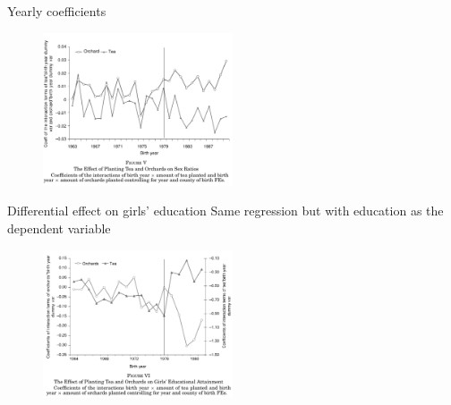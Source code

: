 \documentclass[11pt,notes=hide,aspectratio=169,mathserif]{beamer}
\begin{document}
\begin{frame}{Yearly coefficients}
\begin{figure}
\centering
\includegraphics[width=0.5\textwidth]{inputs/fig5.png}
\end{figure}
\end{frame}

\begin{frame}{Differential effect on girls' education}
Same regression but with education as the dependent variable
\begin{figure}
\centering
\includegraphics[width=0.5\textwidth]{inputs/fig6.png}
\end{figure}
\end{frame}
\end{document}
